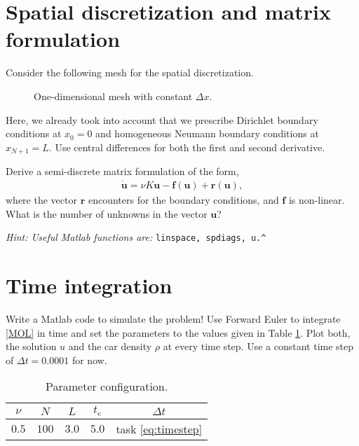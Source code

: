 \documentclass[a4paper,10pt]{article}
\begin{document}
\section{Spatial discretization and matrix formulation}
Consider the following mesh for the spatial discretization.
\begin{figure}[ht]
\centering
{}
\caption{One-dimensional mesh with constant $\Delta x$.}
\end{figure}
Here, we already took into account that we prescribe Dirichlet boundary conditions at $x_0 = 0$ and homogeneous Neumann boundary conditions at $x_{N+1} = L$. Use central differences for both the first and second derivative.

Derive a semi-discrete matrix formulation of the form,
\begin{align}
\label{MOL}
\dot{\mathbf{u}} = \nu K \mathbf{u} - \mathbf{f}(\mathbf{u}) + \mathbf{r}(\mathbf{u}),
\end{align}
where the vector $\mathbf{r}$ encounters for the boundary conditions, and $\mathbf{f}$ is non-linear. What is the number of unknowns in the vector $\mathbf{u}$?

\textit{Hint: Useful Matlab functions are: } \texttt{linspace, spdiags, u.\^ }
\section{Time integration}
\label{ch:euler}
Write a Matlab code to simulate the problem! Use Forward Euler to integrate \eqref{MOL} in time and set the parameters to the values given in Table \ref{params}. Plot both, the solution $u$ and the car density $\rho$ at every time step. Use a constant time step of $\Delta t = 0.0001$ for now.
\begin{table}[ht]
\centering
 \begin{tabular}{|c|c|c|c|c|}
  \hline
  $\nu$ & $N$ & $L$ & $t_e$ & $\Delta t$\\
  \hline
  $0.5$ & $100$ & $3.0$ & $5.0$ & task \ref{eq:timestep}\\
  \hline
 \end{tabular}
\caption{Parameter configuration.}\label{params}
\end{table}
\end{document}
